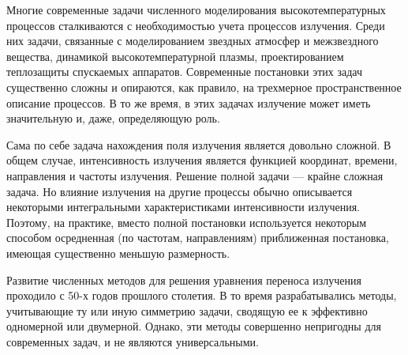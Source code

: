 \intro
Многие современные задачи численного моделирования высокотемпературных процессов сталкиваются с необходимостью учета процессов излучения. Среди них задачи, связанные с моделированием звездных атмосфер и межзвездного вещества, динамикой высокотемпературной плазмы, проектированием теплозащиты спускаемых аппаратов. Современные постановки этих задач существенно сложны и опираются, как правило, на трехмерное пространственное описание процессов. В то же время, в этих задачах излучение может иметь значительную и, даже, определяющую роль.

Сама по себе задача нахождения поля излучения является довольно сложной. В общем случае, интенсивность излучения является функцией координат, времени, направления и частоты излучения. Решение полной задачи — крайне сложная задача. Но влияние излучения на другие процессы обычно описывается некоторыми интегральными характеристиками интенсивности излучения. Поэтому, на практике, вместо полной постановки используется некоторым способом осредненная (по частотам, направлениям)
приближенная постановка, имеющая существенно меньшую размерность.

Развитие численных методов для решения уравнения переноса излучения проходило с 50-х годов прошлого столетия. В то время разрабатывались методы, учитывающие ту или иную симметрию задачи, сводящую ее к эффективно одномерной или двумерной. Однако, эти методы совершенно непригодны для современных задач, и не являются универсальными.